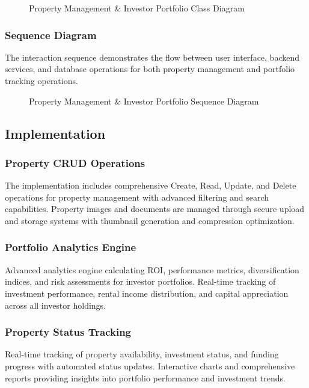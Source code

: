 \begin{figure}[htbp]
    \centering
    \caption{Property Management \& Investor Portfolio Class Diagram}
    \label{fig:property-portfolio-class}
\end{figure}

\subsubsection{Sequence Diagram}
The interaction sequence demonstrates the flow between user interface, backend services, and database operations for both property management and portfolio tracking operations.

\begin{figure}[htbp]
    \centering
    \caption{Property Management \& Investor Portfolio Sequence Diagram}
    \label{fig:property-portfolio-sequence}
\end{figure}

\subsection{Implementation}
\subsubsection{Property CRUD Operations}
The implementation includes comprehensive Create, Read, Update, and Delete operations for property management with advanced filtering and search capabilities. Property images and documents are managed through secure upload and storage systems with thumbnail generation and compression optimization.

\subsubsection{Portfolio Analytics Engine}
Advanced analytics engine calculating ROI, performance metrics, diversification indices, and risk assessments for investor portfolios. Real-time tracking of investment performance, rental income distribution, and capital appreciation across all investor holdings.

\subsubsection{Property Status Tracking}
Real-time tracking of property availability, investment status, and funding progress with automated status updates. Interactive charts and comprehensive reports providing insights into portfolio performance and investment trends.

